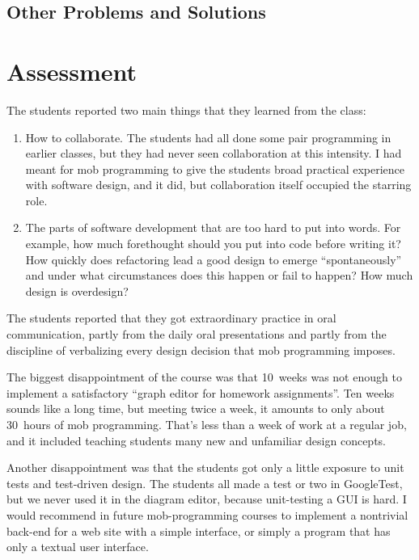 \documentclass{article}
\begin{document}
\subsection{Other Problems and Solutions}

\section{Assessment}

The students reported two main things that they learned from the class:

\begin{enumerate}
\item How to collaborate. The students had all done some pair programming in
earlier classes, but they had never seen collaboration at this intensity. I
had meant for mob programming to give the students broad practical experience
with software design, and it did, but collaboration itself occupied the
starring role.

\item The parts of software development that are too hard to put into words.
For example, how much forethought should you put into code before writing
it? How quickly does refactoring lead a good design to emerge
``spontaneously'' and under what circumstances does this happen or fail to
happen? How much design is overdesign?
\end{enumerate}

The students reported that they got extraordinary practice in oral
communication, partly from the daily oral presentations and partly from the
discipline of verbalizing every design decision that mob programming imposes.

The biggest disappointment of the course was that 10~weeks was not enough to
implement a satisfactory ``graph editor for homework assignments''. Ten weeks
sounds like a long time, but meeting twice a week, it amounts to only
about 30~hours of mob programming.  That's less than a week of work at a
regular job, and it included teaching students many new and unfamiliar design
concepts.

Another disappointment was that the students got only a little exposure to
unit tests and test-driven design. The students all made a test or two in
GoogleTest, but we never used it in the diagram editor, because unit-testing
a GUI is hard. I would recommend in future mob-programming courses to
implement a nontrivial back-end for a web site with a simple interface, or
simply a program that has only a textual user interface.
\end{document}
